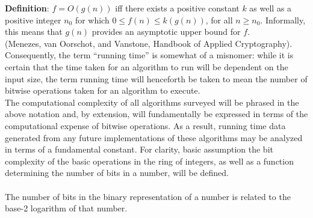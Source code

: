 \documentclass[11pt]{article}
\begin{document}
\indent \textbf{Definition}: $f = O(g(n))$ iff there exists a positive constant $k$ as well as a positive integer $n_0$ for which $0 \leq f(n) \leq k(g(n))$, for all $n \geq n_0$. Informally, this means that $g(n)$ provides an asymptotic upper bound for $f$.\\

(Menezes, van Oorschot, and Vanstone, Handbook of Applied Cryptography).\\

\indent Consequently, the term “running time” is somewhat of a misnomer: while it is certain that the time taken for an algorithm to run will be dependent on the input size, the term running time will henceforth be taken to mean the number of bitwise operations taken for an algorithm to execute. 
\\ \indent The computational complexity of all algorithms surveyed will be phrased in the above notation and, by extension, will fundamentally be expressed in terms of the computational expense of bitwise operations. As a result, running time data generated from any future implementations of these algorithms may be analyzed in terms of a fundamental constant. For clarity, basic assumption the bit complexity of the basic operations in the ring of integers, as well as a function determining the number of bits in a number, will be defined.\\
\\
\indent The number of bits in the binary representation of a number is related to the base-2 logarithm of that number.\\
\end{document}
